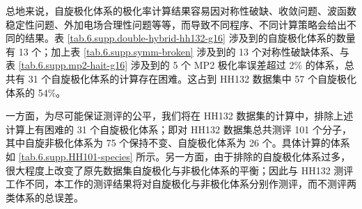 总地来说，自旋极化体系的极化率计算结果容易因对称性破缺、收敛问题、波函数稳定性问题、外加电场合理性问题等等，而导致不同程序、不同计算策略会给出不同的结果。表 \ref{tab.6.supp.double-hybrid-hh132-g16} 涉及到的自旋极化体系的数量有 13 个；加上表 \ref{tab.6.supp.symm-broken} 涉及到的 13 个对称性破缺体系、与表 \ref{tab.6.supp.mp2-hait-g16} 涉及到的 5 个 MP2 极化率误差超过 2\% 的体系，总共有 31 个自旋极化体系的计算存在困难。这占到 HH132 数据集中 57 个自旋极化体系的 54\%。

一方面，为尽可能保证测评的公平，我们将在 HH132 数据集的计算中，排除上述计算上有困难的 31 个自旋极化体系；即对 HH132 数据集总共测评 101 个分子，其中自旋非极化体系为 75 个保持不变、自旋极化体系为 26 个。具体计算的体系如 \ref{tab.6.supp.HH101-species} 所示。另一方面，由于排除的自旋极化体系过多，很大程度上改变了原先数据集自旋极化与非极化体系的平衡；因此与 HH132 测评工作\cite{Hait-Head-Gordon.PCCP.2018}不同，本工作的测评结果将对自旋极化与非极化体系分别作测评，而不测评两类体系的总误差。

